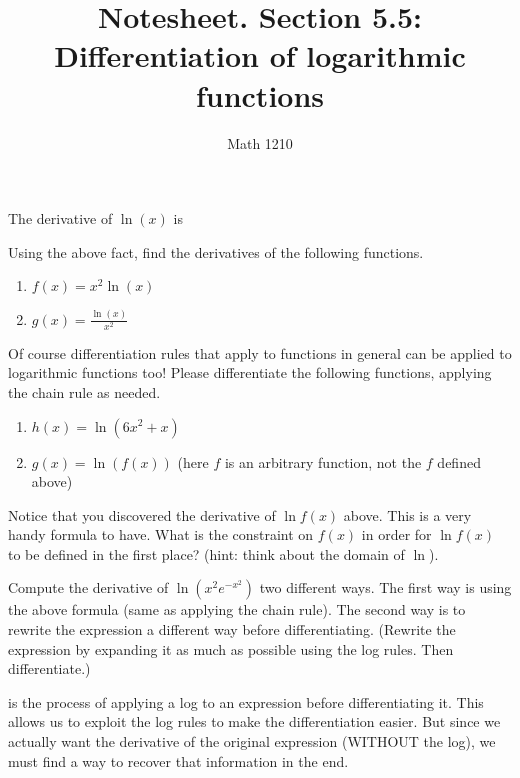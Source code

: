 \documentclass[12pt, a4paper]{article}
\author{Math 1210}
\title{Notesheet. Section 5.5: Differentiation of logarithmic functions}
\date{}
\begin{document}
\maketitle
\nameline
\begin{thrm}
	The derivative of $\ln(x)$ is
\end{thrm}
\vspace{-0.8in}
\begin{ex}
Using the above fact, find the derivatives of the following functions.
  \begin{enumerate}
    \item $f(x) = x^2 \ln(x)$
    \item $g(x) = \frac{\ln(x)}{x^2}$
  \end{enumerate}
\end{ex}
\begin{ex}
  Of course differentiation rules that apply to functions in general can be applied to logarithmic functions too!  Please differentiate the following functions, applying the chain rule as needed.
  \begin{enumerate}
    \item $h(x) = \ln(6x^2 + x)$
    \item $g(x) = \ln(f(x))$ (here $f$ is an arbitrary function, not the $f$ defined above)
  \end{enumerate}
\end{ex}
\pagebreak
\begin{ex}
  Notice that you discovered the derivative of $\ln f(x)$ above.  This is a very handy formula to have.  What is the constraint on $f(x)$ in order for $\ln f(x)$ to be defined in the first place?  (hint: think about the domain of $\ln$).
\end{ex}
\vspace{-2.3in}
\begin{ex}
	Compute the derivative of $\ln(x^2 e^{-x^2})$ two different ways.  The first way is using the above formula (same as applying the chain rule).  The second way is to rewrite the expression a different way before differentiating.  (Rewrite the expression by expanding it as much as possible using the log rules.  Then differentiate.)
\end{ex}
\begin{defi}
	 is the process of applying a log to an expression before differentiating it.  This allows us to exploit the log rules to make the differentiation easier.  But since we actually want the derivative of the original expression (WITHOUT the log), we must find a way to recover that information in the end.
\end{defi}
\end{document}
